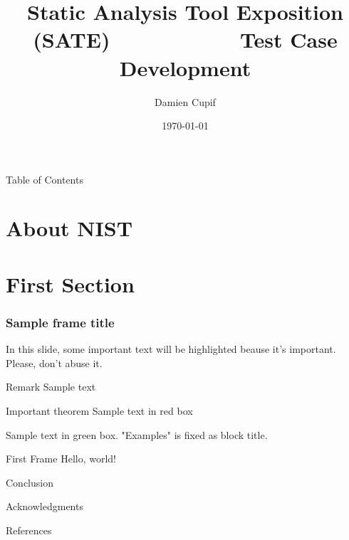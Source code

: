\documentclass{beamer}
\title{Static Analysis Tool Exposition (SATE) ~~~~~~~~~~ Test Case Development}
\date{\today}
\author{Damien Cupif}
\institute{Oral Defense for TELECOM Nancy Master's Degree}
\begin{document}
  \maketitle

  \begin{frame}{Table of Contents}
    \tableofcontents
  \end{frame}

  \section{About NIST}
    \begin{frame}
      
    \end{frame}

  \section{First Section}
    \begin{frame}
      \frametitle{Sample frame title}

      In this slide, some important text will be
      \alert{highlighted} beause it's important.
      Please, don't abuse it.

      \begin{block}{Remark}
      Sample text
      \end{block}

      \begin{alertblock}{Important theorem}
      Sample text in red box
      \end{alertblock}

      \begin{examples}
      Sample text in green box. "Examples" is fixed as block title.
      \end{examples}
    \end{frame}

    \begin{frame}{First Frame}
      Hello, world!
    \end{frame}

  \begin{frame}{Conclusion}
  \end{frame}
    
  \begin{frame}{Acknowledgments}
  \end{frame}

  \begin{frame}{References}
  \end{frame}

  
\end{document}
